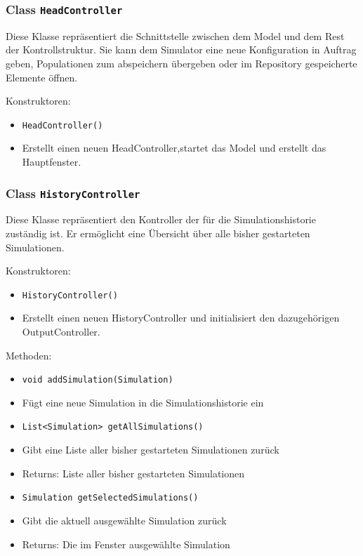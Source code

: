 \documentclass[parskip=full,11pt]{scrartcl}
\begin{document}
\subsubsection{Class \texttt{HeadController}}
Diese Klasse repräsentiert die Schnittstelle zwischen dem Model und dem Rest der Kontrollstruktur. Sie kann dem Simulator eine neue Konfiguration in Auftrag geben, Populationen zum abspeichern übergeben oder im Repository gespeicherte Elemente öffnen.

Konstruktoren:
\begin{itemize}\itemsep -10pt
\item \texttt{HeadController()}
\item[] Erstellt einen neuen HeadController,startet das Model und erstellt das Hauptfenster.
\end{itemize}

\subsubsection{Class \texttt{HistoryController}}
Diese Klasse repräsentiert den Kontroller der für die Simulationshistorie zuständig ist. Er ermöglicht eine Übersicht über alle bisher gestarteten Simulationen.

Konstruktoren:
\begin{itemize}\itemsep -10pt
\item \texttt{HistoryController()}
\item[] Erstellt einen neuen HistoryController und initialisiert den dazugehörigen OutputController.
\end{itemize}

Methoden:
\begin{itemize}\itemsep -10pt
\item \texttt{void addSimulation(Simulation)}
\item[] Fügt eine neue Simulation in die Simulationshistorie ein

\item \texttt{List<Simulation> getAllSimulations()}
\item[] Gibt eine Liste aller bisher gestarteten Simulationen zurück
\item[] Returns: Liste aller bisher gestarteten Simulationen

\item \texttt{Simulation getSelectedSimulations()}
\item[] Gibt die aktuell ausgewählte Simulation zurück
\item[] Returns: Die im Fenster ausgewählte Simulation
\end{itemize}
\end{document}
